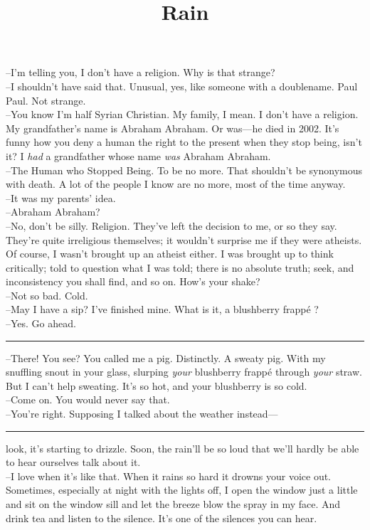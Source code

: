 \documentclass[12pt]{memoir}
\title{Rain}
\date{}
\begin{document}
\maketitle
\noindent
--I'm telling you, I don't have a religion. Why is that strange?\\
--I shouldn't have said that. Unusual, yes, like someone with a doublename. Paul Paul. Not strange.\\
--You know I'm half Syrian Christian. My family, I mean. I don't have a religion. My grandfather's name is Abraham Abraham. Or was---he died in 2002. It's funny how you deny a human the right to the present when they stop being, isn't it? I \emph{had} a grandfather whose name \emph{was} Abraham Abraham.\\
--The Human who Stopped Being. To be no more. That shouldn't be synonymous with death. A lot of the people I know are no more, most of the time anyway.\\
--It was my parents' idea.\\
--Abraham Abraham?\\
--No, don't be silly. Religion. They've left the decision to me, or so they say. They're quite irreligious themselves; it wouldn't surprise me if they were atheists. Of course, I wasn't brought up an atheist either. I was brought up to think critically; told to question what I was told; there is no absolute truth; seek, and inconsistency you shall find, and so on. How's your shake?\\
--Not so bad. Cold.\\
--May I have a sip? I've finished mine. What is it, a blushberry frapp\'{e} ?\\
--Yes. Go ahead. \\
\hrule 
\vspace{\baselineskip}
--There! You see? You called me a pig. Distinctly. A sweaty pig. With my snuffling snout in your glass, slurping \emph{your} blushberry frapp\'{e} through \emph{your} straw. But I can't help sweating. It's so hot, and your blushberry is so cold.\\
--Come on. You would never say that.\\
--You're right. Supposing I talked about the weather instead--- \\
\hrule
\vspace{\baselineskip}
look, it's starting to drizzle. Soon, the rain'll be so loud that we'll hardly be able to hear ourselves talk about it.\\
--I love when it's like that. When it rains so hard it drowns your voice out. Sometimes, especially at night with the lights off, I open the window just a little and sit on the window sill and let the breeze blow the spray in my face. And drink tea and listen to the silence. It's one of the silences you can hear.\\
\end{document}
